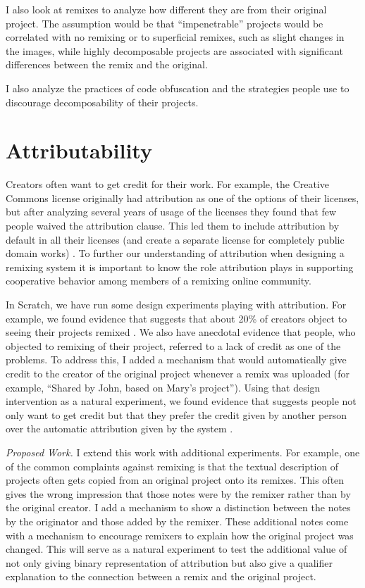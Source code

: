I also look at remixes to analyze how different they are from their original project. 
The assumption would be that ``impenetrable'' projects would be correlated with no remixing or to superficial remixes, such as slight changes in the images, while highly decomposable projects are associated with significant differences between the remix and the original.

I also analyze the practices of code obfuscation and the strategies people use to discourage decomposability of their projects.

\section{Attributability}
Creators often want to get credit for their work. 
For example, the Creative Commons license originally had attribution as one of the options of their licenses, but after analyzing several years of usage of the licenses they found that few people waived the attribution clause. 
This led them to include attribution by default in all their licenses (and create a separate license for completely public domain works) \citep{brown_announcing_2004}.
To further our understanding of attribution when designing a remixing system it is important to know the role attribution plays in supporting cooperative behavior among members of a remixing online community.

In Scratch, we have run some design experiments playing with attribution. 
For example, we found evidence that suggests that about 20\% of creators object to seeing their projects remixed \citep{hill_responses_2010}.
We also have anecdotal evidence that people, who objected to remixing of their project, referred to a lack of credit as one of the problems.
To address this, I added a mechanism that would automatically give credit to the creator of the original project whenever a remix was uploaded (for example, ``Shared by John, based on Mary's project'').
Using that design intervention as a natural experiment, we found evidence that suggests people not only want to get credit but that they prefer the credit given by another person over the automatic attribution given by the system \cite{monroy-hernandez_computers_2011}. 

\emph{Proposed Work.}
I  extend this work with additional experiments.
For example, one of the common complaints against remixing is that the textual description of projects often gets copied from an original project onto its remixes.
This often gives the wrong impression that those notes were by the remixer rather than by the original creator.
I  add a mechanism to show a distinction between the notes by the originator and those added by the remixer.
These additional notes come with a mechanism to encourage remixers to explain how the original project was changed.
This will serve as a natural experiment to test the additional value of not only giving binary representation of attribution but also give a qualifier explanation to the connection between a remix and the original project.

